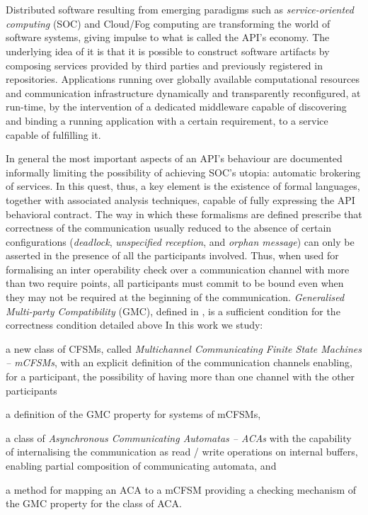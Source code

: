 \chapter*{\runtitle}

Distributed software resulting from emerging paradigms such as \emph{service-oriented computing} (SOC) and Cloud/Fog computing are transforming the world of software systems, giving impulse to what is called the API's economy. The underlying idea of it is that it is possible to construct software artifacts by composing services provided by third parties and previously registered in repositories. Applications running over globally available computational resources and communication infrastructure dynamically and transparently reconfigured, at run-time, by the intervention of a dedicated middleware capable of discovering and binding a running application with a certain requirement, to a service capable of fulfilling it.

In general the most important aspects of an API's behaviour are documented informally limiting the possibility of achieving SOC's utopia: automatic brokering of services. In this quest, thus, a key element is the existence of formal languages, together with associated analysis techniques, capable of fully expressing the API behavioral contract.
The way in which these formalisms are defined prescribe that correctness of the communication usually reduced to the absence of certain configurations\cite{lange:popl15} (\emph{deadlock}, \emph{unspecified reception}, and \emph{orphan message}) can only be asserted in the presence of all the participants involved. Thus, when used for formalising an inter operability check over a communication channel with more than two require points, all participants must commit to be bound even when they may not be required at the beginning of the communication.
\emph{Generalised Multi-party Compatibility} (GMC), defined in \cite{lange:popl15}, is a sufficient condition for the correctness condition detailed above
In this work we study:
\begin{inparaenum}[1)]
 \item a new class of CFSMs, called \emph{Multichannel Communicating Finite State Machines -- mCFSMs}, with an explicit definition of the communication channels enabling, for a participant, the possibility of having more than one channel with the other participants
 \item a definition of the GMC property for systems of mCFSMs, 
 \item a class of \emph{Asynchronous Communicating Automatas -- ACAs} with the capability of internalising the communication as read / write operations on internal buffers, enabling partial composition of communicating automata, and
 \item a method for mapping an ACA to a mCFSM providing a checking mechanism of the GMC property for the class of ACA.
 \end{inparaenum}

